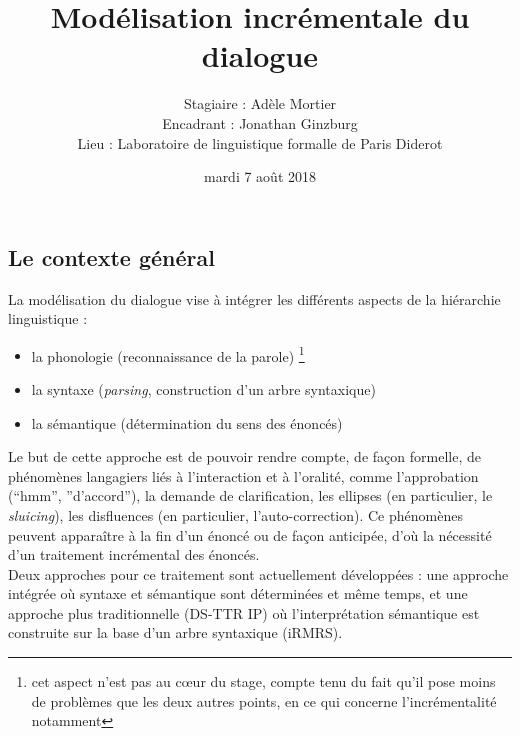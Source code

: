 \documentclass[11pt]{article}
\begin{document}
\title{Modélisation incrémentale du dialogue}

\author{Stagiaire : Adèle Mortier \\
	Encadrant : Jonathan Ginzburg \\
	Lieu : Laboratoire de linguistique formalle de Paris Diderot}

\date{mardi 7 août 2018}

\maketitle

\pagestyle{empty} %
\thispagestyle{empty}



\subsection*{Le contexte général}\label{contexte}
La modélisation du dialogue vise à intégrer les différents aspects de la hiérarchie linguistique :
\begin{itemize}
	\item la phonologie (reconnaissance de la parole) \footnote{cet aspect n'est pas au cœur du stage, compte tenu du fait qu'il pose moins de problèmes que les deux autres points, en ce qui concerne l'incrémentalité notamment}
	\item la syntaxe (\textit{parsing}, construction d'un arbre syntaxique)
	\item la sémantique (détermination du sens des énoncés)
\end{itemize}
Le but de cette approche est de pouvoir rendre compte, de façon formelle, de phénomènes langagiers liés à l'interaction et à l'oralité, comme l'approbation (``hmm'', ''d'accord''), la demande de clarification, les ellipses (en particulier, le \textit{sluicing}), les disfluences (en particulier, l'auto-correction). Ce phénomènes peuvent apparaître à la fin d'un énoncé ou de façon anticipée, d'où la nécessité d'un traitement incrémental des énoncés.\\
Deux approches pour ce traitement sont actuellement développées : une approche intégrée où syntaxe et sémantique sont déterminées et même temps, et une approche plus traditionnelle (DS-TTR IP) où l'interprétation sémantique est construite sur la base d'un arbre syntaxique (iRMRS).

\end{document}
